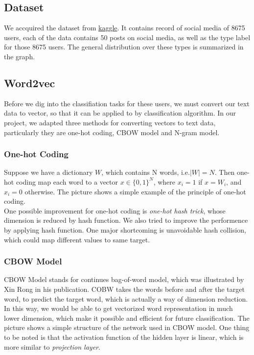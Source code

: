 \documentclass{article}
\begin{document}
\subsection{Dataset}
We accquired the dataset from \href{https://www.kaggle.com/datasnaek/mbti-type}{kaggle}. It contains record of social media of 8675 users, each of the data contains 50 posts on social media, as well as the type label for those 8675 users. The general distribution over these types is summarized in the graph.

\subsection{Word2vec}
Before we dig into the classifiation tasks for these users, we must convert our text data to vector, so that it can be applied to by classification algorithm. In our project, we adapted three methods for converting vectors to text data, particularly they are one-hot coding, CBOW model and N-gram model.

\subsubsection{One-hot Coding}
Suppose we have a dictionary $W$, which contains N words, i.e.$|W|=N$. Then one-hot coding map each word to a vector $x \in \{0,1\}^N$, where $x_i=1$ if $x=W_i$, and $x_i=0$ otherwise. The picture shows a simple example of the principle of one-hot coding.\\
One possible improvement for one-hot coding is \emph{one-hot hash trick}, whose dimension is reduced by hash function. We also tried to improve the performence by applying hash function. One major shortcoming is unavoidable hash collision, which could map different values to same target.

\subsubsection{CBOW Model}
CBOW Model stands for continues bag-of-word model, which was illustrated by Xin Rong in his publication. COBW takes the words before and after the target word, to predict the target word, which is actually a way of dimension reduction. In this way, we would be able to get vectorized word representation in much lower dimension, which make it possible and efficient for future classification. The picture shows a simple structure of the network used in CBOW model. One thing to be noted is that the activation function of the hidden layer is linear, which is more similar to \emph{projection layer}.
\end{document}
